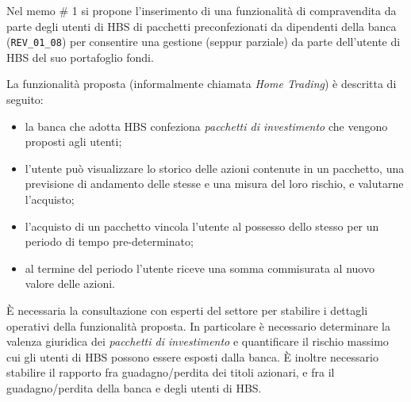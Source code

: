 \documentclass[a4paper,11pt]{texmemo}
\newcommand{\code}[1]{\texttt{#1}}
\begin{document}
\maketitle

Nel memo \# 1 si propone l'inserimento di una funzionalit\`a di compravendita da parte degli utenti di HBS di pacchetti preconfezionati da dipendenti della banca (\code{REV\_01\_08}) per consentire una gestione (seppur parziale) da parte dell'utente di HBS del suo portafoglio fondi.

La funzionalit\`a proposta (informalmente chiamata \emph{Home Trading}) \`e descritta di seguito:
\begin{itemize}
	\item la banca che adotta HBS confeziona \emph{pacchetti di investimento} che vengono proposti agli utenti;
	\item l'utente pu\`o visualizzare lo storico delle azioni contenute in un pacchetto, una previsione di andamento delle stesse e una misura del loro rischio, e valutarne l'acquisto;
	\item l'acquisto di un pacchetto vincola l'utente al possesso dello stesso per un periodo di tempo pre-determinato;
	\item al termine del periodo l'utente riceve una somma commisurata al nuovo valore delle azioni.
\end{itemize}

\`E necessaria la consultazione con esperti del settore per stabilire i dettagli operativi della funzionalit\`a proposta.
In particolare \`e necessario determinare la valenza giuridica dei \emph{pacchetti di investimento} e quantificare il rischio massimo cui gli utenti di HBS possono essere esposti dalla banca.
\`E inoltre necessario stabilire il rapporto fra guadagno/perdita dei titoli azionari, e fra il guadagno/perdita della banca e degli utenti di HBS.
\end{document}
